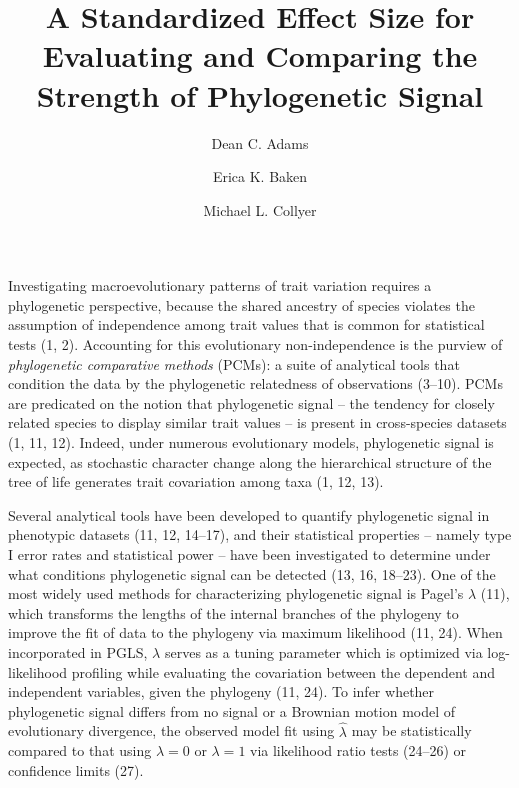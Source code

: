 \documentclass[9pt,twocolumn,twoside,lineno]{pnas-new}
\title{A Standardized Effect Size for Evaluating and Comparing the Strength of
Phylogenetic Signal}
\author[a,2]{Dean C. Adams}
\author[a,b]{Erica K. Baken}
\author[b]{Michael L. Collyer}
\affil[a]{Department of Ecology, Evolution, and Organismal Biology, Iowa State
University, Ames, Iowa, 50010. USA.}
\affil[b]{Department of Science, Chatham University, Pittsburgh, Pennsylvania,
15232. USA.}
\begin{document}
\verticaladjustment{-2pt}

\maketitle
\thispagestyle{firststyle}



Investigating macroevolutionary patterns of trait variation requires a
phylogenetic perspective, because the shared ancestry of species
violates the assumption of independence among trait values that is
common for statistical tests (1, 2). Accounting for this evolutionary
non-independence is the purview of \emph{phylogenetic comparative
methods} (PCMs): a suite of analytical tools that condition the data by
the phylogenetic relatedness of observations (3--10). PCMs are
predicated on the notion that phylogenetic signal -- the tendency for
closely related species to display similar trait values -- is present in
cross-species datasets (1, 11, 12). Indeed, under numerous evolutionary
models, phylogenetic signal is expected, as stochastic character change
along the hierarchical structure of the tree of life generates trait
covariation among taxa (1, 12, 13).

Several analytical tools have been developed to quantify phylogenetic
signal in phenotypic datasets (11, 12, 14--17), and their statistical
properties -- namely type I error rates and statistical power -- have
been investigated to determine under what conditions phylogenetic signal
can be detected (13, 16, 18--23). One of the most widely used methods
for characterizing phylogenetic signal is Pagel's \(\lambda\) (11),
which transforms the lengths of the internal branches of the phylogeny
to improve the fit of data to the phylogeny via maximum likelihood (11,
24). When incorporated in PGLS, \(\lambda\) serves as a tuning parameter
which is optimized via log-likelihood profiling while evaluating the
covariation between the dependent and independent variables, given the
phylogeny (11, 24). To infer whether phylogenetic signal differs from no
signal or a Brownian motion model of evolutionary divergence, the
observed model fit using \(\hat\lambda\) may be statistically compared
to that using \(\lambda=0\) or \(\lambda=1\) via likelihood ratio tests
(24--26) or confidence limits (27).
\end{document}
